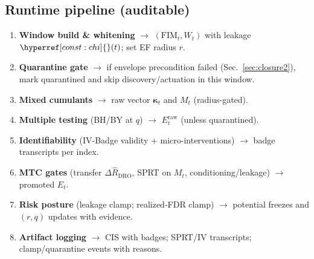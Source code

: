 \documentclass[10pt]{article}
\newcommand{\FIM}{\mathrm{FIM}}
\newcommand{\cutq}{q}
\newcommand{\constref}[1]{\hyperref[const:#1]{\ensuremath{\csname constsym#1\endcsname}}}
\begin{document}
\subsection*{Runtime pipeline (auditable)}
\begin{enumerate}[leftmargin=*,itemsep=2pt]
\item \textbf{Window build \& whitening} $\to$ $(\FIM_t,W_t)$ with leakage $\constref{chi}(t)$; set EF radius $r$.
\item \textbf{Quarantine gate} $\to$ if envelope precondition failed (Sec.~\ref{sec:closure2}), mark \textsf{quarantined} and skip discovery/actuation in this window.
\item \textbf{Mixed cumulants} $\to$ raw vector $\bm\kappa_t$ and $M_t$ (radius-gated).
\item \textbf{Multiple testing} (BH/BY at $\cutq$) $\to$ $E_t^{\mathrm{raw}}$ (unless quarantined).
\item \textbf{Identifiability} (IV-Badge validity + micro-interventions) $\to$ badge transcripts per index.
\item \textbf{MTC gates} (transfer $\Delta\hat R_{\mathrm{DRO}}$, SPRT on $M_t$, conditioning/leakage) $\to$ promoted $E_t$.
\item \textbf{Risk posture} (leakage clamp; realized-FDR clamp) $\to$ potential freezes and $(r,\cutq)$ updates with evidence.
\item \textbf{Artifact logging} $\to$ CIS with badges; SPRT/IV transcripts; clamp/quarantine events with reasons.
\end{enumerate}

\end{document}
